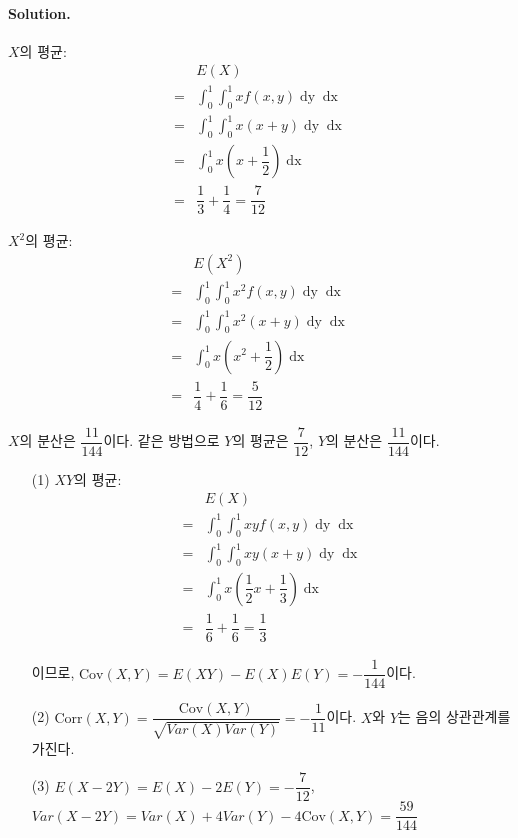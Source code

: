 \paragraph{Solution.} $X$의 평균:
\begin{align*}
	& E\left(X\right) \\
	=& \int_0^1 \int_0^1 xf\left(x, y\right) \mathop{dy} \mathop{dx} \\
	=& \int_0^1 \int_0^1 x\left(x + y\right) \mathop{dy} \mathop{dx} \\
	=& \int_0^1 x\left(x + \dfrac{1}{2}\right) \mathop{dx} \\
	=& \dfrac{1}{3} + \dfrac{1}{4} = \dfrac{7}{12}
\end{align*}

$X^2$의 평균:
\begin{align*}
	& E\left(X^2\right) \\
	=& \int_0^1 \int_0^1 x^2f\left(x, y\right) \mathop{dy} \mathop{dx} \\
	=& \int_0^1 \int_0^1 x^2\left(x + y\right) \mathop{dy} \mathop{dx} \\
	=& \int_0^1 x\left(x^2 + \dfrac{1}{2}\right) \mathop{dx} \\
	=& \dfrac{1}{4} + \dfrac{1}{6} = \dfrac{5}{12}
\end{align*}

$X$의 분산은 $\dfrac{11}{144}$이다. 같은 방법으로 $Y$의 평균은 $\dfrac{7}{12}$, $Y$의 분산은 $\dfrac{11}{144}$이다.
\begin{itemize}
  \item [(1)] $XY$의 평균:
\begin{align*}
	& E\left(X\right) \\
	=& \int_0^1 \int_0^1 xyf\left(x, y\right) \mathop{dy} \mathop{dx} \\
	=& \int_0^1 \int_0^1 xy\left(x + y\right) \mathop{dy} \mathop{dx} \\
	=& \int_0^1 x\left(\dfrac{1}{2}x + \dfrac{1}{3}\right) \mathop{dx} \\
	=& \dfrac{1}{6} + \dfrac{1}{6} = \dfrac{1}{3}
\end{align*}

이므로, $\mathrm{Cov}\left(X, Y\right) = E\left(XY\right) - E\left(X\right)E\left(Y\right) = -\dfrac{1}{144}$이다.\\

  \item [(2)] $\mathrm{Corr}\left(X, Y\right) = \dfrac{\mathrm{Cov}\left(X, Y\right)}{\sqrt{Var\left(X\right)Var\left(Y\right)}} = -\dfrac{1}{11}$이다. $X$와 $Y$는 음의 상관관계를 가진다.\\
  \item [(3)] $E\left(X-2Y\right)	= E\left(X\right) - 2E\left(Y\right)	 = -\dfrac{7}{12}$, $Var\left(X-2Y\right) = Var\left(X\right) + 4Var\left(Y\right) - 4\mathrm{Cov}\left(X, Y\right) = \dfrac{59}{144}$
\end{itemize}